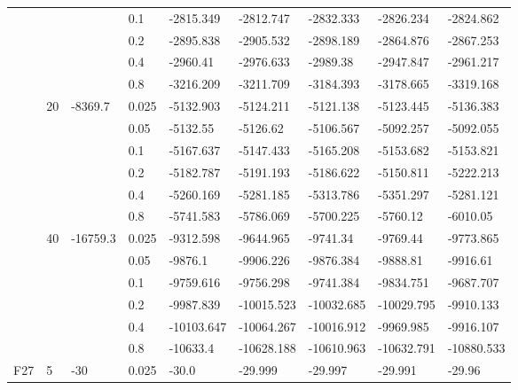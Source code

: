 \begin{longtable}{|l|l|l|l|l|l|l|l|l|}
\cmidrule{4-9} &     &          & 0.1            & -2815.349  & -2812.747  & -2832.333  & -2826.234  & -2824.862  \\
\cmidrule{4-9} &     &          & 0.2            & -2895.838  & -2905.532  & -2898.189  & -2864.876  & -2867.253  \\
\cmidrule{4-9} &     &          & 0.4            & -2960.41   & -2976.633  & -2989.38   & -2947.847  & -2961.217  \\
\cmidrule{4-9} &     &          & 0.8            & -3216.209  & -3211.709  & -3184.393  & -3178.665  & -3319.168  \\
\cmidrule{2-9} & 20  & -8369.7  & 0.025          & -5132.903  & -5124.211  & -5121.138  & -5123.445  & -5136.383  \\
\cmidrule{4-9} &     &          & 0.05           & -5132.55   & -5126.62   & -5106.567  & -5092.257  & -5092.055  \\
\cmidrule{4-9} &     &          & 0.1            & -5167.637  & -5147.433  & -5165.208  & -5153.682  & -5153.821  \\
\cmidrule{4-9} &     &          & 0.2            & -5182.787  & -5191.193  & -5186.622  & -5150.811  & -5222.213  \\
\cmidrule{4-9} &     &          & 0.4            & -5260.169  & -5281.185  & -5313.786  & -5351.297  & -5281.121  \\
\cmidrule{4-9} &     &          & 0.8            & -5741.583  & -5786.069  & -5700.225  & -5760.12   & -6010.05   \\
\cmidrule{2-9} & 40  & -16759.3 & 0.025          & -9312.598  & -9644.965  & -9741.34   & -9769.44   & -9773.865  \\
\cmidrule{4-9} &     &          & 0.05           & -9876.1    & -9906.226  & -9876.384  & -9888.81   & -9916.61   \\
\cmidrule{4-9} &     &          & 0.1            & -9759.616  & -9756.298  & -9741.384  & -9834.751  & -9687.707  \\
\cmidrule{4-9} &     &          & 0.2            & -9987.839  & -10015.523 & -10032.685 & -10029.795 & -9910.133  \\
\cmidrule{4-9} &     &          & 0.4            & -10103.647 & -10064.267 & -10016.912 & -9969.985  & -9916.107  \\
\cmidrule{4-9} &     &          & 0.8            & -10633.4   & -10628.188 & -10610.963 & -10632.791 & -10880.533 \\ \midrule
F27            & 5   & -30      & 0.025          & -30.0      & -29.999    & -29.997    & -29.991    & -29.96     \\

\end{longtable}
